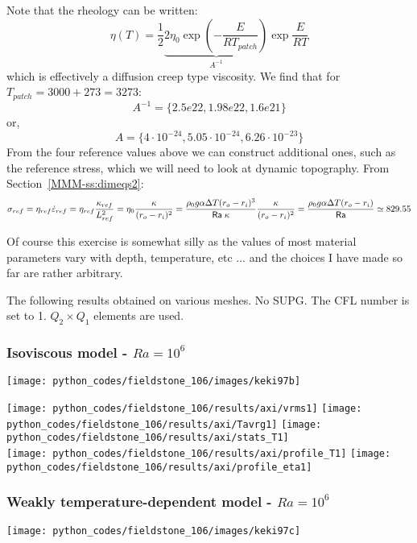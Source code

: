 Note that the rheology can be written:
\[
\eta(T)  
= \frac12 \underbrace{2 \eta_0  \exp\left( -\frac{E}{R T_{patch}} \right) }_{A^{-1}} \exp \frac{E}{R T}  
\]
which is effectively a diffusion creep type viscosity.
We find that for $T_{patch}=3000+273=3273$: 
\[
A^{-1} = \{ 2.5e22, 1.98e22 , 1.6e21 \}
\]
or, 
\[
A = \{ 4\cdot 10^{-24}    , 5.05\cdot 10^{-24}   ,  6.26\cdot 10^{-23}\} 
\]
From the four reference values above we can construct additional ones, 
such as the reference stress, which we will need to look at dynamic topography.
From Section~\ref{MMM-ss:dimeqs2}:
\[
\sigma_{ref} 
= \eta_{ref} \dot{\varepsilon}_{ref} 
= \eta_{ref} \frac{\kappa_{ref}}{L^2_{ref}} 
= \eta_0 \frac{\kappa }{ (r_o-r_i)^2}
= \frac{\rho_0 g \alpha \Delta T (r_o-r_i)^3}{{\mathsf{Ra}} \; \kappa} \frac{\kappa}{(r_o-r_i)^2}
= \frac{\rho_0 g \alpha \Delta T (r_o-r_i)}{{\mathsf{Ra}}}
\simeq 829.55  
\] 


Of course this exercise is somewhat silly as the values of most material parameters
vary with depth, temperature, etc ... and the choices I have made so far are rather arbitrary.

The following results obtained on various meshes. 
No SUPG. The CFL number is set to 1. 
$Q_2\times Q_1$ elements are used. 

\newpage
\subsubsection*{Isoviscous model - $Ra=10^6$}

\begin{center}
\texttt{[image: python\_codes/fieldstone\_106/images/keki97b]}
\end{center}


\begin{center}
\texttt{[image: python\_codes/fieldstone\_106/results/axi/vrms1]}
\texttt{[image: python\_codes/fieldstone\_106/results/axi/Tavrg1]}
\texttt{[image: python\_codes/fieldstone\_106/results/axi/stats\_T1]}\\
\texttt{[image: python\_codes/fieldstone\_106/results/axi/profile\_T1]}
\texttt{[image: python\_codes/fieldstone\_106/results/axi/profile\_eta1]}
\end{center}




\newpage
\subsubsection*{Weakly temperature-dependent model - $Ra=10^6$}
\begin{center}
\texttt{[image: python\_codes/fieldstone\_106/images/keki97c]}
\end{center}

